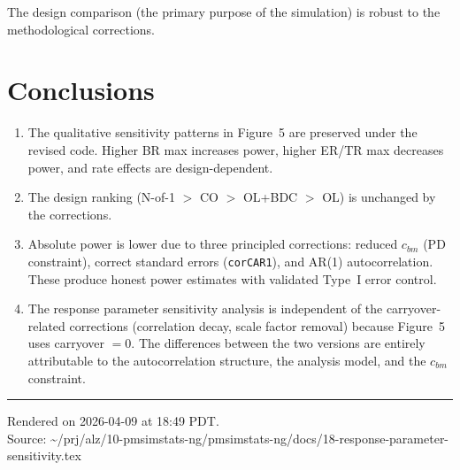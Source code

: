 \documentclass[11pt]{article}
\begin{document}
The design comparison (the primary purpose of the
simulation) is robust to the methodological corrections.

\section{Conclusions}

\begin{enumerate}
\item The qualitative sensitivity patterns in Figure~5 are
  preserved under the revised code. Higher BR max increases
  power, higher ER/TR max decreases power, and rate effects
  are design-dependent.

\item The design ranking (N-of-1 $>$ CO $>$ OL+BDC $>$ OL)
  is unchanged by the corrections.

\item Absolute power is lower due to three principled
  corrections: reduced $c_{bm}$ (PD constraint), correct
  standard errors (\texttt{corCAR1}), and AR(1)
  autocorrelation. These produce honest power estimates
  with validated Type~I error control.

\item The response parameter sensitivity analysis is
  independent of the carryover-related corrections
  (correlation decay, scale factor removal) because
  Figure~5 uses carryover $= 0$. The differences between
  the two versions are entirely attributable to the
  autocorrelation structure, the analysis model, and the
  $c_{bm}$ constraint.
\end{enumerate}

\vfill
\noindent\rule{\textwidth}{0.4pt}
{\footnotesize
Rendered on 2026-04-09 at 18:49 PDT.\\
Source: \textasciitilde/prj/alz/10-pmsimstats-ng/pmsimstats-ng/docs/18-response-parameter-sensitivity.tex}
\end{document}
